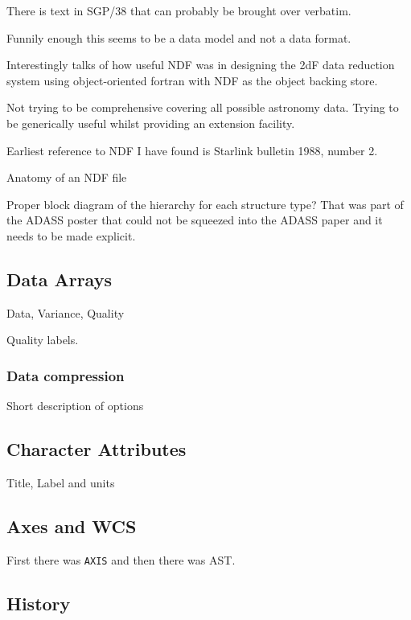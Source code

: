 \documentclass[final,authoryear,5p,times,twocolumn]{elsarticle}
\begin{document}
{{\color{red}
There is text in SGP/38 that can probably be brought over verbatim.

Funnily enough this seems to be a data model and not a data format.

Interestingly \citet{1993ASPC...52..199B} talks of how useful NDF was in designing the
2dF data reduction system using object-oriented fortran with NDF as
the object backing store.

Not trying to be comprehensive covering all possible astronomy
data. Trying to be generically useful whilst providing an extension facility.

Earliest reference to NDF I have found is Starlink bulletin 1988,
number 2. \citep{1988STARB...2...11C}

Anatomy of an NDF file

Proper block diagram of the hierarchy for each structure type? That
was part of the ADASS poster that could not be squeezed into the ADASS
paper and it needs to be made explicit.
}

\subsection{Data Arrays}

{\color{red}
Data, Variance, Quality

Quality labels.
}
\subsubsection{Data compression}

{\color{red} Short description of options \citep{2008ASPC..394..650C}}

\subsection{Character Attributes}

{\color{red} Title, Label and units}

\subsection{Axes and WCS}

{\color{red} First there was \texttt{AXIS} and then there was AST. \citep{1998ASPC..145...41W,2001ASPC..238..129B}}

\subsection{History}

}
\end{document}
